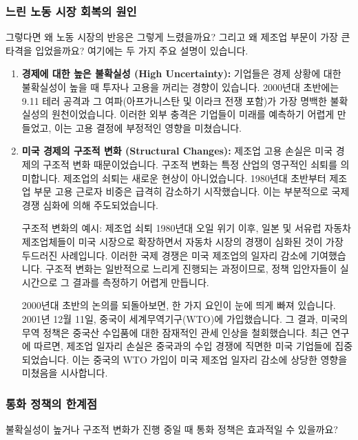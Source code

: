 \documentclass[11pt,a4paper]{article}
\theoremstyle{definition}
\begin{document}
\subsubsection{느린 노동 시장 회복의 원인}
그렇다면 왜 노동 시장의 반응은 그렇게 느렸을까요? 그리고 왜 제조업 부문이 가장 큰 타격을 입었을까요? 여기에는 두 가지 주요 설명이 있습니다.

\begin{enumerate}
    \item \textbf{경제에 대한 높은 불확실성 (High Uncertainty):}
    기업들은 경제 상황에 대한 불확실성이 높을 때 투자나 고용을 꺼리는 경향이 있습니다. 2000년대 초반에는 9.11 테러 공격과 그 여파(아프가니스탄 및 이라크 전쟁 포함)가 가장 명백한 불확실성의 원천이었습니다. 이러한 외부 충격은 기업들이 미래를 예측하기 어렵게 만들었고, 이는 고용 결정에 부정적인 영향을 미쳤습니다.

    \item \textbf{미국 경제의 구조적 변화 (Structural Changes):}
    제조업 고용 손실은 미국 경제의 구조적 변화 때문이었습니다. 구조적 변화는 특정 산업의 영구적인 쇠퇴를 의미합니다. 제조업의 쇠퇴는 새로운 현상이 아니었습니다. 1980년대 초반부터 제조업 부문 고용 근로자 비중은 급격히 감소하기 시작했습니다. 이는 부분적으로 국제 경쟁 심화에 의해 주도되었습니다.

    \begin{examplebox}{구조적 변화의 예시: 제조업 쇠퇴}
    1980년대 오일 위기 이후, 일본 및 서유럽 자동차 제조업체들이 미국 시장으로 확장하면서 자동차 시장의 경쟁이 심화된 것이 가장 두드러진 사례입니다. 이러한 국제 경쟁은 미국 제조업의 일자리 감소에 기여했습니다. 구조적 변화는 일반적으로 느리게 진행되는 과정이므로, 정책 입안자들이 실시간으로 그 결과를 측정하기 어렵게 만듭니다.

    2000년대 초반의 논의를 되돌아보면, 한 가지 요인이 눈에 띄게 빠져 있습니다. 2001년 12월 11일, 중국이 세계무역기구(WTO)에 가입했습니다. 그 결과, 미국의 무역 정책은 중국산 수입품에 대한 잠재적인 관세 인상을 철회했습니다. 최근 연구에 따르면, 제조업 일자리 손실은 중국과의 수입 경쟁에 직면한 미국 기업들에 집중되었습니다. 이는 중국의 WTO 가입이 미국 제조업 일자리 감소에 상당한 영향을 미쳤음을 시사합니다.
    \end{examplebox}
\end{enumerate}

\subsubsection{통화 정책의 한계점}
불확실성이 높거나 구조적 변화가 진행 중일 때 통화 정책은 효과적일 수 있을까요?
\end{document}
